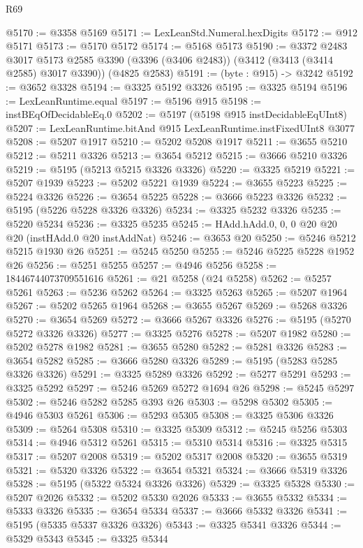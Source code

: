 \begin{lexlean}{R69}
\begin{coremodule}
@5170 := @3358 @5169
@5171 := LexLeanStd.Numeral.hexDigits
@5172 := @912 @5171
@5173 := @5170 @5172
@5174 := @5168 @5173
@5190 := @3372
    @2483
    @3017
    @5173
    @2585
    @3390
    (@3396 (@3406 @2483))
    (@3412 (@3413 (@3414 @2585) @3017 @3390))
    (@4825 @2583)
@5191 := (byte : @915) -> @3242
@5192 := @3652 @3328
@5194 := @3325 @5192 @3326
@5195 := @3325 @5194
@5196 := LexLeanRuntime.equal
@5197 := @5196 @915
@5198 := instBEqOfDecidableEq.{0}
@5202 := @5197 (@5198 @915 instDecidableEqUInt8)
@5207 := LexLeanRuntime.bitAnd @915 LexLeanRuntime.instFixedUInt8 @3077
@5208 := @5207 @1917
@5210 := @5202 @5208 @1917
@5211 := @3655 @5210
@5212 := @5211 @3326
@5213 := @3654 @5212
@5215 := @3666 @5210 @3326
@5219 := @5195 (@5213 @5215 @3326 @3326)
@5220 := @3325 @5219
@5221 := @5207 @1939
@5223 := @5202 @5221 @1939
@5224 := @3655 @5223
@5225 := @5224 @3326
@5226 := @3654 @5225
@5228 := @3666 @5223 @3326
@5232 := @5195 (@5226 @5228 @3326 @3326)
@5234 := @3325 @5232 @3326
@5235 := @5220 @5234
@5236 := @3325 @5235
@5245 := HAdd.hAdd.{0, 0, 0} @20 @20 @20 (instHAdd.{0} @20 instAddNat)
@5246 := @3653 @20
@5250 := @5246 @5212 @5215 @1930 @26
@5251 := @5245 @5250
@5255 := @5246 @5225 @5228 @1952 @26
@5256 := @5251 @5255
@5257 := @4946 @5256
@5258 := 18446744073709551616
@5261 := @21 @5258 (@24 @5258)
@5262 := @5257 @5261
@5263 := @5236 @5262
@5264 := @3325 @5263
@5265 := @5207 @1964
@5267 := @5202 @5265 @1964
@5268 := @3655 @5267
@5269 := @5268 @3326
@5270 := @3654 @5269
@5272 := @3666 @5267 @3326
@5276 := @5195 (@5270 @5272 @3326 @3326)
@5277 := @3325 @5276
@5278 := @5207 @1982
@5280 := @5202 @5278 @1982
@5281 := @3655 @5280
@5282 := @5281 @3326
@5283 := @3654 @5282
@5285 := @3666 @5280 @3326
@5289 := @5195 (@5283 @5285 @3326 @3326)
@5291 := @3325 @5289 @3326
@5292 := @5277 @5291
@5293 := @3325 @5292
@5297 := @5246 @5269 @5272 @1694 @26
@5298 := @5245 @5297
@5302 := @5246 @5282 @5285 @393 @26
@5303 := @5298 @5302
@5305 := @4946 @5303 @5261
@5306 := @5293 @5305
@5308 := @3325 @5306 @3326
@5309 := @5264 @5308
@5310 := @3325 @5309
@5312 := @5245 @5256 @5303
@5314 := @4946 @5312 @5261
@5315 := @5310 @5314
@5316 := @3325 @5315
@5317 := @5207 @2008
@5319 := @5202 @5317 @2008
@5320 := @3655 @5319
@5321 := @5320 @3326
@5322 := @3654 @5321
@5324 := @3666 @5319 @3326
@5328 := @5195 (@5322 @5324 @3326 @3326)
@5329 := @3325 @5328
@5330 := @5207 @2026
@5332 := @5202 @5330 @2026
@5333 := @3655 @5332
@5334 := @5333 @3326
@5335 := @3654 @5334
@5337 := @3666 @5332 @3326
@5341 := @5195 (@5335 @5337 @3326 @3326)
@5343 := @3325 @5341 @3326
@5344 := @5329 @5343
@5345 := @3325 @5344

\end{coremodule}
\end{lexlean}
